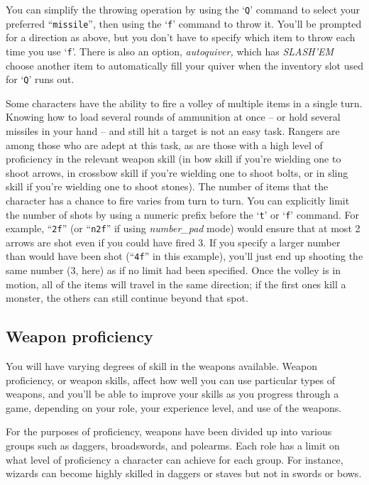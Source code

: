 You can simplify the throwing operation by using the `{\tt Q}' command to
select your preferred ``{\tt missile}'', then using the `{\tt f}' command to
throw it.  You'll be prompted for a direction as above, but you don't
have to specify which item to throw each time you use `{\tt f}'.  There is
also an option,
{\it autoquiver,\/} 
which has {\it SLASH'EM\/} choose another item to automatically fill your
quiver when the inventory slot used for `{\tt Q}' runs out.

Some characters have the ability to fire a volley of multiple items in a
single turn.  Knowing how to load several rounds of ammunition at
once -- or hold several missiles in your hand -- and still hit a
target is not an easy task.  Rangers are among those who are adept
at this task, as are those with a high level of proficiency in the
relevant weapon skill (in bow skill if you're wielding one to
shoot arrows, in crossbow skill if you're wielding one to shoot bolts,
or in sling skill if you're wielding one to shoot stones).
The number of items that the character has a chance to fire varies from
turn to turn.  You can explicitly limit the number of shots by using a
numeric prefix before the `{\tt t}' or `{\tt f}' command.
For example, ``{\tt 2f}'' (or ``{\tt n2f}'' if using
{\it number_pad\/} 
mode) would ensure that at most 2 arrows are shot
even if you could have fired 3.  If you specify
a larger number than would have been shot (``{\tt 4f}'' in this example),
you'll just end up shooting the same number (3, here) as if no limit
had been specified.  Once the volley is in motion, all of the items
will travel in the same direction; if the first ones kill a monster,
the others can still continue beyond that spot.
\subsection*{Weapon proficiency}


You will have varying degrees of skill in the weapons available.
Weapon proficiency, or weapon skills, affect how well you can use
particular types of weapons, and you'll be able to improve your skills
as you progress through a game, depending on your role, your experience
level, and use of the weapons.

For the purposes of proficiency, weapons have
been divided up into various groups such as daggers, broadswords, and
polearms.  Each role has a limit on what level of proficiency a character
can achieve for each group.  For instance, wizards can become highly
skilled in daggers or staves but not in swords or bows.

